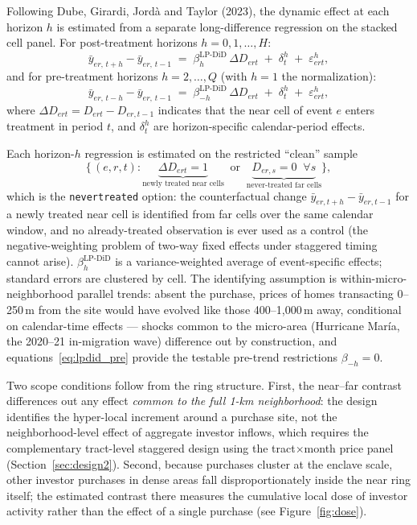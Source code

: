 \documentclass[11pt]{article}
\begin{document}
Following Dube, Girardi, Jord\`a and Taylor (2023), the dynamic effect at each
horizon $h$ is estimated from a separate long-difference regression on the
stacked cell panel. For post-treatment horizons $h = 0, 1, \dots, H$:
\begin{equation}
  \bar{y}_{er,\,t+h} - \bar{y}_{er,\,t-1}
  \;=\;
  \beta_h^{\text{LP-DiD}}\, \Delta D_{ert}
  \;+\; \delta_t^{h}
  \;+\; \varepsilon_{ert}^{h},
  \label{eq:lpdid_post}
\end{equation}
and for pre-treatment horizons $h = 2, \dots, Q$ (with $h=1$ the normalization):
\begin{equation}
  \bar{y}_{er,\,t-h} - \bar{y}_{er,\,t-1}
  \;=\;
  \beta_{-h}^{\text{LP-DiD}}\, \Delta D_{ert}
  \;+\; \delta_t^{h}
  \;+\; \varepsilon_{ert}^{h},
  \label{eq:lpdid_pre}
\end{equation}
where $\Delta D_{ert} = D_{ert} - D_{er,t-1}$ indicates that the near cell of
event $e$ enters treatment in period $t$, and $\delta_t^h$ are
horizon-specific calendar-period effects.

Each horizon-$h$ regression is estimated on the restricted ``clean'' sample
\begin{equation}
  \Big\{\, (e,r,t) : \underbrace{\Delta D_{ert} = 1}_{\text{newly treated near cells}}
  \;\;\text{or}\;\;
  \underbrace{D_{er,s} = 0 \;\; \forall s}_{\text{never-treated far cells}} \Big\},
\end{equation}
which is the \texttt{nevertreated} option: the counterfactual change
$\bar{y}_{er,t+h} - \bar{y}_{er,t-1}$ for a newly treated near cell is
identified from far cells over the same calendar window, and no
already-treated observation is ever used as a control (the negative-weighting
problem of two-way fixed effects under staggered timing cannot arise).
$\beta_h^{\text{LP-DiD}}$ is a variance-weighted average of event-specific
effects; standard errors are clustered by cell. The identifying assumption is
within-micro-neighborhood parallel trends: absent the purchase, prices of homes
transacting 0--250\,m from the site would have evolved like those
400--1{,}000\,m away, conditional on calendar-time effects --- shocks common to
the micro-area (Hurricane Mar\'ia, the 2020--21 in-migration wave) difference
out by construction, and equations~\eqref{eq:lpdid_pre} provide the testable
pre-trend restrictions $\beta_{-h} = 0$.

Two scope conditions follow from the ring structure. First, the near--far
contrast differences out any effect \emph{common to the full 1-km
neighborhood}: the design identifies the hyper-local increment around a
purchase site, not the neighborhood-level effect of aggregate investor
inflows, which requires the complementary tract-level staggered design using
the tract$\times$month price panel (Section~\ref{sec:design2}). Second,
because purchases cluster at the enclave scale, other investor purchases in
dense areas fall disproportionately inside the near ring itself; the
estimated contrast there measures the cumulative local dose of investor
activity rather than the effect of a single purchase (see
Figure~\ref{fig:dose}).
\end{document}
